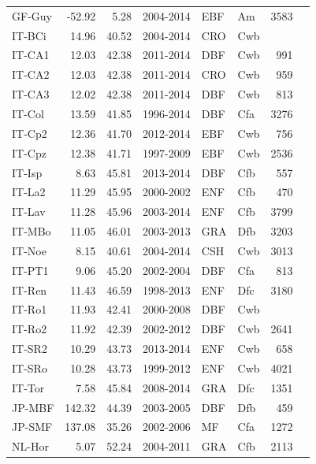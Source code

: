 \documentclass{myreport}
\begin{document}
\begin{longtable}{lrrlllrl}
 GF-Guy & -52.92 & 5.28 & 2004-2014 & EBF & Am & 3583 & \cite{GF-Guy} \\ 
 IT-BCi & 14.96 & 40.52 & 2004-2014 & CRO & Cwb &  & \cite{IT-BCi} \\ 
 IT-CA1 & 12.03 & 42.38 & 2011-2014 & DBF & Cwb & 991 & \cite{IT-CA1} \\ 
 IT-CA2 & 12.03 & 42.38 & 2011-2014 & CRO & Cwb & 959 & \cite{IT-CA2} \\ 
 IT-CA3 & 12.02 & 42.38 & 2011-2014 & DBF & Cwb & 813 & \cite{IT-CA3} \\ 
 IT-Col & 13.59 & 41.85 & 1996-2014 & DBF & Cfa & 3276 & \cite{IT-Col} \\ 
 IT-Cp2 & 12.36 & 41.70 & 2012-2014 & EBF & Cwb & 756 & \cite{IT-Cp2} \\ 
 IT-Cpz & 12.38 & 41.71 & 1997-2009 & EBF & Cwb & 2536 & \cite{IT-Cpz} \\ 
 IT-Isp & 8.63 & 45.81 & 2013-2014 & DBF & Cfb & 557 & \cite{IT-Isp} \\ 
 IT-La2 & 11.29 & 45.95 & 2000-2002 & ENF & Cfb & 470 & \cite{IT-La2} \\ 
 IT-Lav & 11.28 & 45.96 & 2003-2014 & ENF & Cfb & 3799 & \cite{IT-Lav} \\ 
 IT-MBo & 11.05 & 46.01 & 2003-2013 & GRA & Dfb & 3203 & \cite{IT-MBo} \\ 
 IT-Noe & 8.15 & 40.61 & 2004-2014 & CSH & Cwb & 3013 & \cite{IT-Noe} \\ 
 IT-PT1 & 9.06 & 45.20 & 2002-2004 & DBF & Cfa & 813 & \cite{IT-PT1} \\ 
 IT-Ren & 11.43 & 46.59 & 1998-2013 & ENF & Dfc & 3180 & \cite{IT-Ren} \\ 
 IT-Ro1 & 11.93 & 42.41 & 2000-2008 & DBF & Cwb &  & \cite{IT-Ro1} \\ 
 IT-Ro2 & 11.92 & 42.39 & 2002-2012 & DBF & Cwb & 2641 & \cite{IT-Ro2} \\ 
 IT-SR2 & 10.29 & 43.73 & 2013-2014 & ENF & Cwb & 658 & \cite{IT-SR2} \\ 
 IT-SRo & 10.28 & 43.73 & 1999-2012 & ENF & Cwb & 4021 & \cite{IT-SRo} \\ 
 IT-Tor & 7.58 & 45.84 & 2008-2014 & GRA & Dfc & 1351 & \cite{IT-Tor} \\ 
 JP-MBF & 142.32 & 44.39 & 2003-2005 & DBF & Dfb & 459 & \cite{JP-MBF} \\ 
 JP-SMF & 137.08 & 35.26 & 2002-2006 & MF & Cfa & 1272 & \cite{JP-SMF} \\ 
 NL-Hor & 5.07 & 52.24 & 2004-2011 & GRA & Cfb & 2113 & \cite{NL-Hor} \\ 

\end{longtable}
\end{document}
